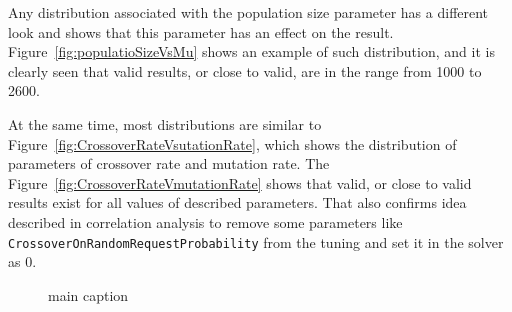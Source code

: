 Any distribution associated with the population size parameter has a different look and shows that this parameter has an effect on the result.
Figure~\ref{fig:populatioSizeVsMu} shows an example of such distribution, and it is clearly seen that valid results, or close to valid, are in the range from 1000 to 2600.

At the same time, most distributions are similar to Figure~\ref{fig:CrossoverRateVsutationRate}, which shows the distribution of parameters of crossover rate and mutation rate. 
The Figure~\ref{fig:CrossoverRateVmutationRate} shows that valid, or close to valid results exist for all values of described parameters. That also confirms idea described in correlation analysis to remove some parameters like \texttt{CrossoverOnRandomRequestProbability} from the tuning and set it in the solver as 0.

\begin{figure}
	
	
	\caption{main caption}	
\end{figure}

